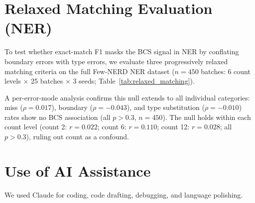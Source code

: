 \documentclass[11pt]{article}
\begin{document}
\section{Relaxed Matching Evaluation (NER)}
\label{app:relaxed-matching}

To test whether exact-match F1 masks the BCS signal in NER by conflating boundary errors with type errors, we evaluate three progressively relaxed matching criteria on the full Few-NERD NER dataset ($n = 450$ batches: 6 count levels $\times$ 25 batches $\times$ 3 seeds; Table~\ref{tab:relaxed_matching}).

\begin{table}[h!]
\centering
\small
\caption{BCS--F1 correlation under progressively relaxed NER matching. Relaxed span credits a match if the predicted span overlaps the gold span and the type is correct; token overlap uses token-level intersection; type-ignored drops the type constraint entirely. Relaxed matching improves mean F1 by 4.2\,pp (98.4\% of batches improve), but Pearson $r$ remains near zero across all modes (bootstrap 95\% CI crosses zero in all cases). Boundary errors affect all batches uniformly and do not mask a BCS signal.}
\label{tab:relaxed_matching}
\end{table}

A per-error-mode analysis confirms this null extends to all individual categories: miss ($\rho = 0.017$), boundary ($\rho = -0.043$), and type substitution ($\rho = -0.010$) rates show no BCS association (all $p > 0.3$, $n = 450$). The null holds within each count level (count 2: $r = 0.022$; count 6: $r = 0.110$; count 12: $r = 0.028$; all $p > 0.3$), ruling out count as a confound.

\section{Use of AI Assistance}
We used Claude for coding, code drafting, debugging, and language polishing.
\end{document}
